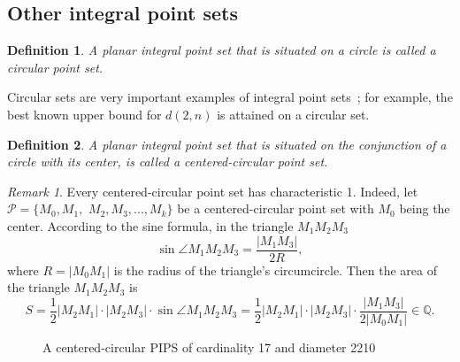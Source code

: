 \documentclass[12pt]{article}
\theoremstyle{theorem}
\theoremstyle{dfn}
\newtheorem{dfn}{Definition}
\theoremstyle{remark}
\newtheorem{remark}{Remark}
\begin{document}

\subsection{Other integral point sets}

\begin{dfn}
	A planar integral point set that is situated on a circle is called a \textit{circular}
	point set.
\end{dfn}

Circular sets are very important examples
of integral point sets~\cite{harborth1993upper,piepmeyer1996maximum,bat2018number};
for example, the best known upper bound for $d(2,n)$
is attained on a circular set.


\begin{dfn}
	A planar integral point set that is situated on the conjunction of a circle with its center,
	is called a \textit{centered-circular} point set.
\end{dfn}

\begin{remark}
	Every centered-circular point set has characteristic 1.
	Indeed, let $\mathcal{P} = \{M_0, M_1,$ $ M_2, M_3, ..., M_k\}$ be a centered-circular point set
	with $M_0$ being the center.
	According to the sine formula, in the triangle $M_1 M_2 M_3$
	\begin{equation}
		\sin \angle M_1 M_2 M_3 = \frac{|M_1M_3|}{2R}
		,
	\end{equation}
	where $R = |M_0 M_1| $ is the radius of the triangle's circumcircle.
	Then the area of the triangle $M_1 M_2 M_3$ is
	\begin{equation}
		S = \frac12 |M_2 M_1| \cdot |M_2 M_3| \cdot \sin \angle M_1 M_2 M_3 =
		\frac12 |M_2 M_1| \cdot |M_2 M_3| \cdot \frac{|M_1M_3|}{2|M_0 M_1|} \in\mathbb Q
		.
	\end{equation}
\end{remark}

\begin{figure}[h!]
\parbox{0.7\linewidth}{\caption{A centered-circular PIPS of cardinality 17 and diameter 2210}
\label{17_2210_1_acc4a56887abb3c3a315712ea083f0e7_centered_circle.png}}
\end{figure}
\end{document}
